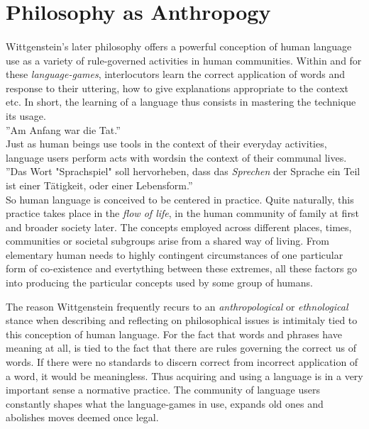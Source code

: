 \documentclass{article}
\begin{document}
\section{Philosophy as Anthropogy}
\paragraph{} Wittgenstein's later philosophy offers a powerful conception of human language use as a variety of rule-governed activities in human communities. Within and for these \textit{language-games}, interlocutors learn the correct application of words and response to their uttering, how to give explanations appropriate to the context etc. In short, the learning of a language thus consists in mastering the technique its usage. \\
''Am Anfang war die Tat.''\\
Just as human beings use tools in the context of their everyday activities, language users perform acts with wordsin the context of their communal lives.\\
''Das Wort "Sprachspiel" soll hervorheben, dass das \textit{Sprechen} der Sprache ein Teil ist einer T{\"a}tigkeit, oder einer Lebensform.''\\ %
So human language is conceived to be centered in practice. Quite naturally, this practice takes place in the \textit{flow of life}, in the human community of family at first and broader society later. The concepts employed across different places, times, communities or societal subgroups arise from a shared way of living. From elementary human needs to highly contingent circumstances of one particular form of co-existence and evertything between these extremes, all these factors go into producing the particular concepts used by some group of humans.

The reason Wittgenstein frequently recurs to an \textit{anthropological} or \textit{ethnological} stance when describing and reflecting on philosophical issues is intimitaly tied to this conception of human language. For the fact that words and phrases have meaning at all, is tied to the fact that there are rules governing the correct us of words. If there were no standards to discern correct from incorrect application of a word, it would be meaningless. %
Thus acquiring and using a language is in a very important sense a normative practice. The community of language users constantly shapes what the language-games in use, expands old ones and abolishes moves deemed once legal.
\end{document}

